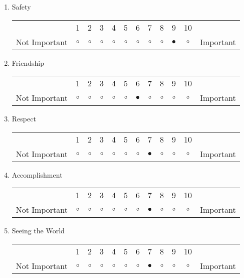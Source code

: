 \documentclass{article}
\begin{document}
\begin{enumerate}
\item Safety\\
\vspace{5pt}
\begin{tabular}{c c c c c c c c c c c c}
     & 1 & 2 & 3 & 4 & 5 & 6 & 7 & 8 & 9 & 10 & \\
    Not Important & $\circ$ & $\circ$ & $\circ$ & $\circ$ & $\circ$ & $\circ$ & $\circ$ & $\circ$ & $\bullet$ & $\circ$ & Important \\ 
\end{tabular}

\item Friendship\\
\vspace{5pt}
\begin{tabular}{c c c c c c c c c c c c}
     & 1 & 2 & 3 & 4 & 5 & 6 & 7 & 8 & 9 & 10 & \\
    Not Important & $\circ$ & $\circ$ & $\circ$ & $\circ$ & $\circ$ & $\bullet$ & $\circ$ & $\circ$ & $\circ$ & $\circ$ & Important \\ 
\end{tabular}

\item Respect\\
\vspace{5pt}
\begin{tabular}{c c c c c c c c c c c c}
     & 1 & 2 & 3 & 4 & 5 & 6 & 7 & 8 & 9 & 10 & \\
    Not Important & $\circ$ & $\circ$ & $\circ$ & $\circ$ & $\circ$ & $\circ$ & $\bullet$ & $\circ$ & $\circ$ & $\circ$ & Important \\ 
\end{tabular}

\item Accomplishment\\
\vspace{5pt}
\begin{tabular}{c c c c c c c c c c c c}
     & 1 & 2 & 3 & 4 & 5 & 6 & 7 & 8 & 9 & 10 & \\
    Not Important & $\circ$ & $\circ$ & $\circ$ & $\circ$ & $\circ$ & $\circ$ & $\bullet$ & $\circ$ & $\circ$ & $\circ$ & Important \\ 
\end{tabular}

\item Seeing the World\\
\vspace{5pt}
\begin{tabular}{c c c c c c c c c c c c}
     & 1 & 2 & 3 & 4 & 5 & 6 & 7 & 8 & 9 & 10 & \\
    Not Important & $\circ$ & $\circ$ & $\circ$ & $\circ$ & $\circ$ & $\circ$ & $\bullet$ & $\circ$ & $\circ$ & $\circ$ & Important \\ 
\end{tabular}


\end{enumerate}
\end{document}
